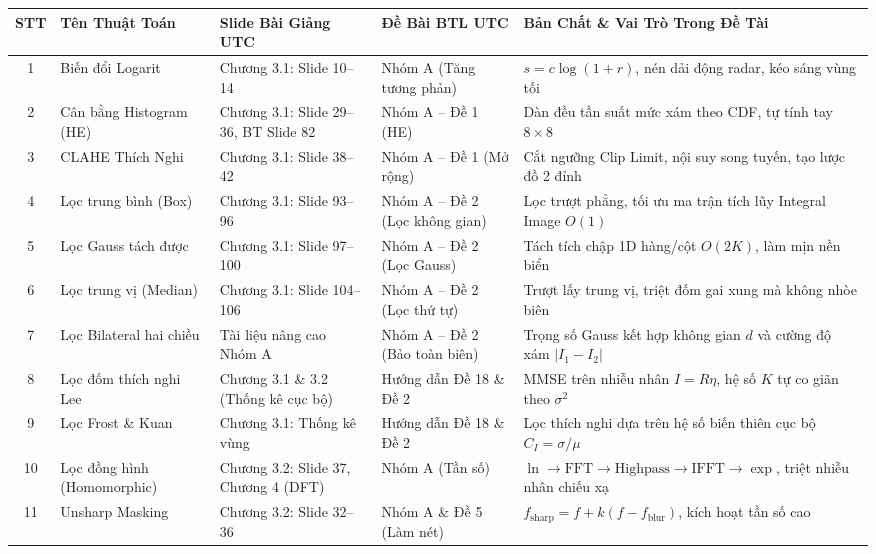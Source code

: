 \documentclass[11pt,a4paper]{article}
\begin{document}
\begin{table}[H]
\centering
\small
\begin{tabularx}{\textwidth}{|c|>{\raggedright\arraybackslash}p{2.6cm}|>{\raggedright\arraybackslash}p{3.2cm}|>{\raggedright\arraybackslash}p{2.6cm}|X|}
\hline
\textbf{STT} & \textbf{Tên Thuật Toán} & \textbf{Slide Bài Giảng UTC} & \textbf{Đề Bài BTL UTC} & \textbf{Bản Chất \& Vai Trò Trong Đề Tài} \\
\hline
1 & Biến đổi Logarit & Chương 3.1: Slide 10--14 & Nhóm A (Tăng tương phản) & $s = c \log(1+r)$, nén dải động radar, kéo sáng vùng tối \\
\hline
2 & Cân bằng Histogram (HE) & Chương 3.1: Slide 29--36, BT Slide 82 & Nhóm A -- Đề 1 (HE) & Dàn đều tần suất mức xám theo CDF, tự tính tay $8 \times 8$ \\
\hline
3 & CLAHE Thích Nghi & Chương 3.1: Slide 38--42 & Nhóm A -- Đề 1 (Mở rộng) & Cắt ngưỡng Clip Limit, nội suy song tuyến, tạo lược đồ 2 đỉnh \\
\hline
4 & Lọc trung bình (Box) & Chương 3.1: Slide 93--96 & Nhóm A -- Đề 2 (Lọc không gian) & Lọc trượt phẳng, tối ưu ma trận tích lũy Integral Image $O(1)$ \\
\hline
5 & Lọc Gauss tách được & Chương 3.1: Slide 97--100 & Nhóm A -- Đề 2 (Lọc Gauss) & Tách tích chập 1D hàng/cột $O(2K)$, làm mịn nền biển \\
\hline
6 & Lọc trung vị (Median) & Chương 3.1: Slide 104--106 & Nhóm A -- Đề 2 (Lọc thứ tự) & Trượt lấy trung vị, triệt đốm gai xung mà không nhòe biên \\
\hline
7 & Lọc Bilateral hai chiều & Tài liệu nâng cao Nhóm A & Nhóm A -- Đề 2 (Bảo toàn biên) & Trọng số Gauss kết hợp không gian $d$ và cường độ xám $|I_1-I_2|$ \\
\hline
8 & Lọc đốm thích nghi Lee & Chương 3.1 \& 3.2 (Thống kê cục bộ) & Hướng dẫn Đề 18 \& Đề 2 & MMSE trên nhiễu nhân $I=R\eta$, hệ số $K$ tự co giãn theo $\sigma^2$ \\
\hline
9 & Lọc Frost \& Kuan & Chương 3.1: Thống kê vùng & Hướng dẫn Đề 18 \& Đề 2 & Lọc thích nghi dựa trên hệ số biến thiên cục bộ $C_I = \sigma/\mu$ \\
\hline
10 & Lọc đồng hình (Homomorphic) & Chương 3.2: Slide 37, Chương 4 (DFT) & Nhóm A (Tần số) & $\ln \to \text{FFT} \to \text{Highpass} \to \text{IFFT} \to \exp$, triệt nhiễu nhân chiếu xạ \\
\hline
11 & Unsharp Masking & Chương 3.2: Slide 32--36 & Nhóm A \& Đề 5 (Làm nét) & $f_{\text{sharp}} = f + k(f - f_{\text{blur}})$, kích hoạt tần số cao \\

\end{tabularx}
\end{table}
\end{document}
